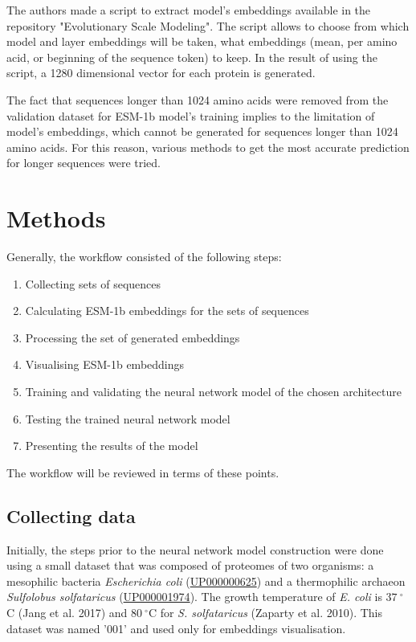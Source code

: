 \documentclass[12pt]{report}
\begin{document}
	The authors made a script to extract model's embeddings available in the 
	repository "Evolutionary Scale Modeling". The script allows to choose 
	from which model and layer embeddings will be taken, what embeddings 
	(mean, per amino acid, or beginning of the sequence token) to keep. In the
	result of using the script, a 1280 dimensional vector for each protein is 
	generated.
	
	The fact that sequences longer than 1024 amino acids were removed from the 
	validation dataset for ESM-1b model's training implies to the limitation of 
	model's embeddings, which cannot be generated for sequences longer than 
	1024 amino acids. For this reason, various methods to get the most accurate 
	prediction for longer sequences were tried.

	\newpage

	\section{Methods}

	Generally, the workflow consisted of the following steps:

	\begin{enumerate}
		\item Collecting sets of sequences
		\item Calculating ESM-1b embeddings for the sets of sequences
		\item Processing the set of generated embeddings
		\item Visualising ESM-1b embeddings
		\item Training and validating the neural network model of the chosen architecture 
		\item Testing the trained neural network model
		\item Presenting the results of the model
	\end{enumerate}

	The workflow will be reviewed in terms of these points.

	\subsection{Collecting data}

	Initially, the steps prior to the neural network model construction 
	were done using a small dataset that was composed of proteomes of two 
	organisms: a mesophilic bacteria \textit{Escherichia coli} 
	(\href{https://www.uniprot.org/proteomes/UP000000625}{UP000000625}) and a 
	thermophilic archaeon \textit{Sulfolobus solfataricus} 
	(\href{https://www.uniprot.org/proteomes/UP000001974}{UP000001974}). The 
	growth temperature of \textit{E. coli} is $37\ ^\circ$C (Jang et al. 2017) 
	and $80\ ^\circ$C for \textit{S. solfataricus} (Zaparty et al. 2010). This 
	dataset was named '001' and used only for embeddings visualisation.
\end{document}
